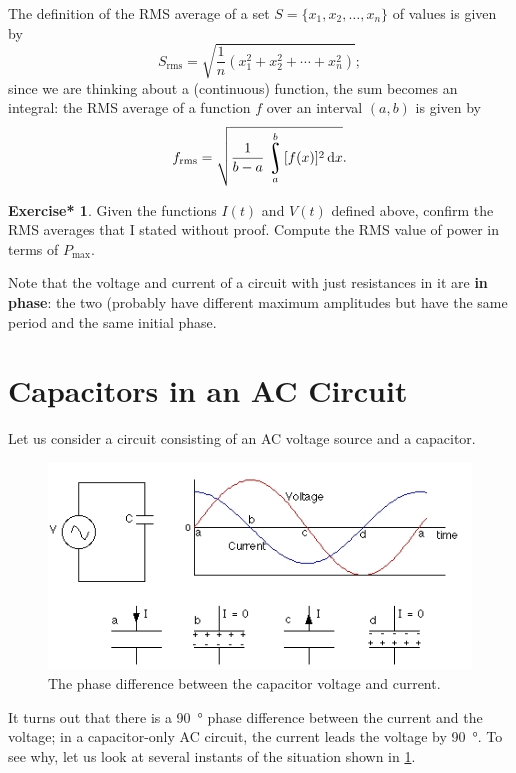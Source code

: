 \documentclass[a4paper]{amsbook}
\newcommand{\marginsymbol}{}
\theoremstyle{definition}
\numberwithin{exercise}{chapter}
\newtheorem{exercise*}[exercise]{Exercise*}
\numberwithin{exercise}{chapter}
\DeclareMathOperator*{\rint}{\scalerel*{\rotatebox{17}{$\!\int\!$}}{\int}}
\begin{document}
The definition of the RMS average of a set $ S = \{x_1, x_2, \dots, x_n \} $ of values is given by
\begin{displaymath}
  S_\text{rms} = \sqrt{\frac{1}{n} \left( x_1^2 + x_2^2 + \cdots + x_n^2 \right)};
\end{displaymath}
since we are thinking about a (continuous) function, the sum becomes an integral: the RMS average of a function $ f $ over an
interval $ (a, b) $ is given by
\begin{displaymath}
  f_\text{rms} = \sqrt{\frac{1}{b - a} \rint^b_a [f(x)]^2 \dif{x}}.
\end{displaymath}

\begin{exercise*}
  Given the functions $ I(t) $ and $ V(t) $ defined above, confirm the RMS averages that I stated without proof. Compute
  the RMS value of power in terms of $ P_\text{max} $.
\end{exercise*}

Note that the voltage and current of a circuit with just resistances in it are \textbf{in phase}: the two (probably have different maximum
amplitudes but have the same period and the same initial phase.

\section{Capacitors in an AC Circuit}
Let us consider a circuit consisting of an AC voltage source and a capacitor.

\begin{figure}
  \centering
  \includegraphics[width=\textwidth]{accap}
  \caption{The phase difference between the capacitor voltage and current.}\label{fig:accap}
\end{figure}

\marginsymbol It turns out that there is a \SI{90}{\degree} phase difference between the current and the voltage; in a capacitor-only AC
circuit, the current leads the voltage by \SI{90}{\degree}. To see why, let us look at several instants of the situation shown in \cref{fig:accap}.
\end{document}
